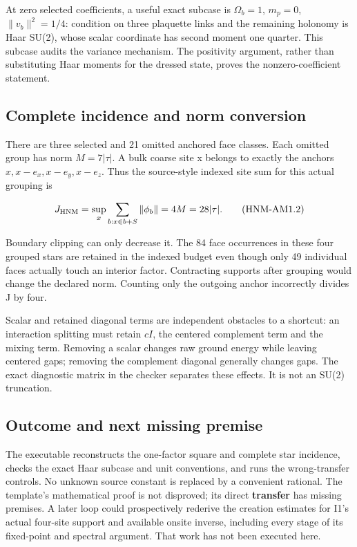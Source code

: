 At zero selected coefficients, a useful exact subcase is \(\Omega_b=1\), \(m_p=0\), \(\|v_b\|^{2}=1/4\): condition on three plaquette links and the remaining holonomy is Haar SU(2), whose scalar coordinate has second moment one quarter. This subcase audits the variance mechanism. The positivity argument, rather than substituting Haar moments for the dressed state, proves the nonzero-coefficient statement.

\hypertarget{r29-am1-complete-incidence-and-norm-conversion}{%
\subsection{Complete incidence and norm conversion}\label{r29:am1:r29-am1-complete-incidence-and-norm-conversion}}

There are three selected and 21 omitted anchored face classes. Each omitted group has norm \(M=7|\tau|\). A bulk coarse site x belongs to exactly the anchors \(x,x-e_x,x-e_y,x-e_z\). Thus the source-style indexed site sum for this actual grouping is

\begin{equation}
J_{\rm HNM}=\sup_x\sum_{b:x\in b+S}\|\phi_b\|=4M=28|\tau|.
\tag{HNM-AM1.2}
\label{r29:am1:eq2}
\end{equation}

Boundary clipping can only decrease it. The 84 face occurrences in these four grouped stars are retained in the indexed budget even though only 49 individual faces actually touch an interior factor. Contracting supports after grouping would change the declared norm. Counting only the outgoing anchor incorrectly divides J by four.

Scalar and retained diagonal terms are independent obstacles to a shortcut: an interaction splitting must retain \(cI\), the centered complement term and the mixing term. Removing a scalar changes raw ground energy while leaving centered gaps; removing the complement diagonal generally changes gaps. The exact diagnostic matrix in the checker separates these effects. It is not an SU(2) truncation.

\hypertarget{r29-am1-outcome-and-next-missing-premise}{%
\subsection{Outcome and next missing premise}\label{r29:am1:r29-am1-outcome-and-next-missing-premise}}

The executable reconstructs the one-factor square and complete star incidence, checks the exact Haar subcase and unit conventions, and runs the wrong-transfer controls. No unknown source constant is replaced by a convenient rational. The template's mathematical proof is not disproved; its direct \textbf{transfer} has missing premises. A later loop could prospectively rederive the creation estimates for I1's actual four-site support and available onsite inverse, including every stage of its fixed-point and spectral argument. That work has not been executed here.

